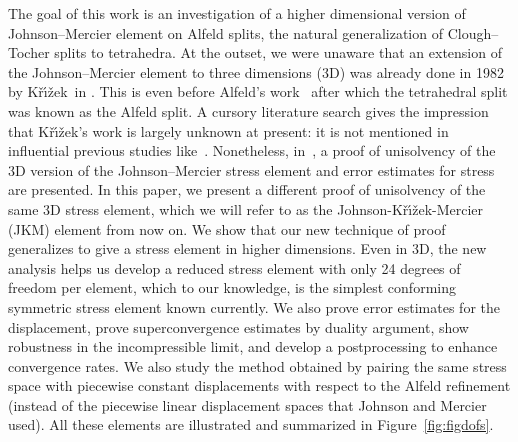 \documentclass[12pt]{amsart}
\numberwithin{equation}{section}
\newcommand{\Krizek}{K\v{r}\'{\i}\v{z}ek}
\theoremstyle{definition}
\theoremstyle{remark}
\renewcommand{\(}{\bigl(}
\renewcommand{\)}{\bigr)}
\begin{document}
The goal of this work is an investigation of a higher dimensional
version of Johnson--Mercier element on Alfeld splits, the natural
generalization of Clough--Tocher splits to tetrahedra.  At the outset, we
were unaware that an extension of the Johnson--Mercier element to 
three dimensions (3D) was already done in 1982 by \Krizek\ in
\cite{Krizek1982}. This is even before Alfeld's work~\cite{Alfel84}
after which the tetrahedral split was known as the Alfeld split.
A cursory literature search gives the impression that \Krizek's work
is largely unknown at present: it is not mentioned in influential
previous studies
like~\cite{arnold2008finite,hu2015family,hu2016low,gong2023discrete,Stenberg-2023,Huang-2023lowordermixed}.
Nonetheless, in~\cite{Krizek1982}, a proof of unisolvency of the 3D version of
the Johnson--Mercier stress element
and error estimates for stress are
presented.
In this paper, we present a different
proof of unisolvency of the same 3D stress element, 
which we will refer to as the Johnson-\Krizek-Mercier (JKM) element from now on.
We show that our
new technique of proof generalizes to give a stress element in higher
dimensions. Even in 3D, the new analysis helps us develop a
reduced stress element with only 24 degrees of freedom per element,
which to our knowledge, is the simplest conforming symmetric stress
element known currently.  We also prove error estimates for the
displacement, prove superconvergence estimates by duality argument,
show robustness in the incompressible limit, and develop a
postprocessing to enhance convergence rates. We also study the method
obtained by pairing the same stress space with piecewise constant
displacements with respect to the Alfeld refinement (instead of the
piecewise linear displacement spaces that Johnson and Mercier used).
All these elements are illustrated and summarized in Figure~\ref{fig:figdofs}.
\end{document}
